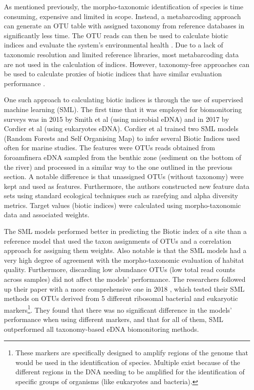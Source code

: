 As mentioned previously, the morpho-taxonomic identification of species is time consuming, expensive and limited in scope. Instead, a metabarcoding approach can generate an OTU table with assigned taxonomy from reference databases in significantly less time. The OTU reads can then be used to calculate biotic indices and evaluate the system's environmental health  \cite{lejzerowicz_high-throughput_2015}. Due to a lack of taxonomic resolution and limited reference libraries, most metabarcoding data are not used in the calculation of indices. However, taxonomy-free approaches can be used to calculate proxies of biotic indices that have similar evaluation performance \cite{apotheloz-perret-gentil_taxonomy-free_2017}. 

One such approach to calculating biotic indices is through the use of supervised machine learning (SML). The first time that it was employed for biomonitoring surveys was in 2015 by Smith et al \cite{smith_natural_2015} (using microbial eDNA) and in 2017 by Cordier et al \cite{cordier_predicting_2017} (using eukaryotes eDNA). Cordier et al trained two SML models (Random Forests and Self Organising Map) to infer several Biotic Indices used often for marine studies. The features were OTUs reads obtained from foroamfinera eDNA sampled from the benthic zone (sediment on the bottom of the river) and processed in a similar way to the one outlined in the previous section. A notable difference is that unassigned OTUs (without taxonomy) were kept and used as features. Furthermore, the authors constructed new feature data sets using standard ecological techniques such as rarefying and alpha diversity metrics. Target values (biotic indices) were calculated using morpho-taxonomic data and associated weights. 

The SML models performed better in predicting the Biotic index of a site than a reference model that used the taxon assignments of OTUs and a correlation approach for assigning them weights. Also notable is that the SML models had a very high degree of agreement with the morpho-taxonomic evaluation of habitat quality. Furthermore, discarding low abundance OTUs (low total read counts across samples) did not affect the models' performance. The researchers followed up their paper with a more comprehensive one in 2018 \cite{cordier_supervised_2018}, which tested their SML methods on OTUs derived from 5 different ribosomal bacterial and eukaryotic markers\footnote{These markers are specifically designed to amplify regions of the genome that would be used in the identification of species. Multiple exist because of the different regions in the DNA needing to be amplified for the identification of specific groups of organisms (like eukaryotes and bacteria).}. They found that there was no significant difference in the models' performance when using different markers, and that for all of them, SML outperformed all taxonomy-based eDNA biomonitoring methods. 



